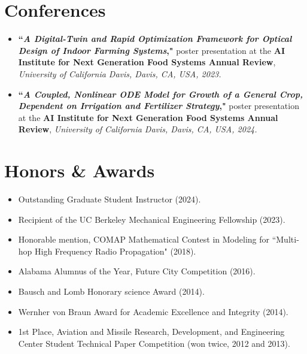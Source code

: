 \documentclass[letterpaper,10.8pt]{article}
\newcommand{\resumeItemNoTitle}[2]{\item\small{\textbf{#1}{ #2 \vspace{-2pt}}}}
\newcommand{\resumeSubHeadingListStart}{\begin{itemize}[leftmargin=*]}
\newcommand{\resumeSubHeadingListEnd}{\end{itemize}}
\begin{document}
\section{Conferences}
\resumeSubHeadingListStart  
\resumeItemNoTitle{``\textit{A Digital-Twin and Rapid Optimization Framework for Optical Design of Indoor Farming Systems}," }{poster presentation at the \textbf{AI Institute for Next Generation Food Systems Annual Review}, \textit{University of California Davis, Davis, CA, USA, 2023.}}
\resumeItemNoTitle{``\textit{A Coupled, Nonlinear ODE Model for Growth of a General Crop, Dependent on Irrigation and Fertilizer Strategy}," }{poster presentation at the \textbf{AI Institute for Next Generation Food Systems Annual Review}, \textit{University of California Davis, Davis, CA, USA, 2024.}}
\resumeSubHeadingListEnd

\section{Honors \& Awards}
\resumeSubHeadingListStart
\resumeItemNoTitle{}{Outstanding Graduate Student Instructor (2024).} 
\resumeItemNoTitle{}{Recipient of the UC Berkeley Mechanical Engineering Fellowship (2023).}
\resumeItemNoTitle{}{Honorable mention, COMAP Mathematical Contest in Modeling for ``Multi-hop High Frequency Radio Propagation" (2018).}
\resumeItemNoTitle{}{Alabama Alumnus of the Year, Future City Competition (2016).}
\resumeItemNoTitle{}{Bausch and Lomb Honorary science Award (2014).}
\resumeItemNoTitle{}{Wernher von Braun Award for Academic Excellence and Integrity (2014).}
\resumeItemNoTitle{}{1st Place, Aviation and Missile Research, Development, and Engineering Center Student Technical Paper Competition (won twice, 2012 and 2013).}
\resumeSubHeadingListEnd

\end{document}
